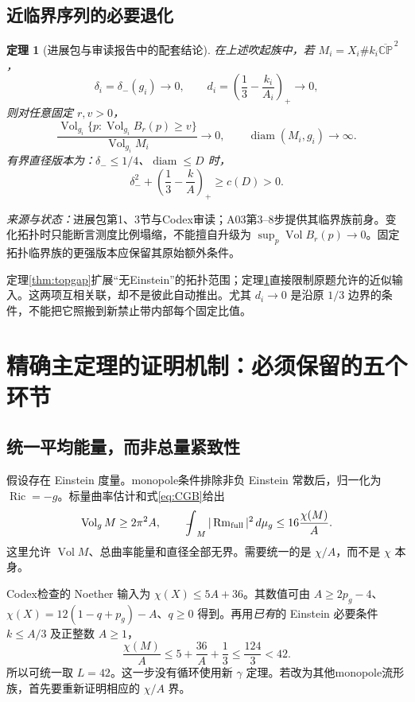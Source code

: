 \documentclass[UTF8,a4paper,11pt,fontset=fandol]{ctexart}
\numberwithin{equation}{section}
\newtheorem{theorem}{定理}[section]
\theoremstyle{definition}
\newcommand{\Ric}{\operatorname{Ric}}
\newcommand{\Rm}{\operatorname{Rm}}
\newcommand{\Vol}{\operatorname{Vol}}
\newcommand{\diam}{\operatorname{diam}}
\newcommand{\CP}{\mathbb{CP}}
\newcommand{\dd}{\,d\mu_g}
\newcommand{\fint}{\mathop{\rlap{\,\raisebox{0.1ex}{\tiny$-$}}\int}\nolimits}
\newcommand{\source}[1]{\par\noindent\textit{来源与状态：}#1\par}
\begin{document}
\subsection{近临界序列的必要退化}
\begin{theorem}[进展包与审读报告中的配套结论]\label{thm:collapse}
在上述吹起族中，若 $M_i=X_i\#k_i\overline{\CP}^{\,2}$，
\[
\delta_i=\delta_-(g_i)\longrightarrow0,
\qquad d_i=\left(\frac13-\frac{k_i}{A_i}\right)_+\longrightarrow0,
\]
则对任意固定 $r,v>0$，
\begin{equation}\label{eq:measurecollapse}
\frac{\Vol_{g_i}\{p:\Vol_{g_i}B_r(p)\ge v\}}
{\Vol_{g_i}M_i}\longrightarrow0,
\qquad \diam(M_i,g_i)\longrightarrow\infty.
\end{equation}
有界直径版本为：$\delta_-\le1/4$、$\diam\le D$ 时，
\begin{equation}\label{eq:diambound}
\delta_-^2+\left(\frac13-\frac{k}{A}\right)_+\ge c(D)>0.
\end{equation}
\end{theorem}
\source{进展包第1、3节与Codex审读；A03第3--8步提供其临界族前身。变化拓扑时只能断言测度比例塌缩，不能擅自升级为 $\sup_p\Vol B_r(p)\to0$。固定拓扑临界族的更强版本应保留其原始额外条件。}

定理\ref{thm:topgap}扩展“无Einstein”的拓扑范围；定理\ref{thm:collapse}直接限制原题允许的近似输入。这两项互相关联，却不是彼此自动推出。尤其 $d_i\to0$ 是沿原 $1/3$ 边界的条件，不能把它照搬到新禁止带内部每个固定比值。

\section{精确主定理的证明机制：必须保留的五个环节}
\subsection{统一平均能量，而非总量紧致性}
假设存在 Einstein 度量。monopole条件排除非负 Einstein 常数后，归一化为 $\Ric=-g$。标量曲率估计和式\eqref{eq:CGB}给出
\begin{equation}\label{eq:budget}
 \Vol_gM\ge2\pi^2A,
 \qquad \fint_M|\Rm_{\rm full}|^2\dd
 \le16\frac{\chi(M)}A.
\end{equation}
这里允许 $\Vol M$、总曲率能量和直径全部无界。需要统一的是 $\chi/A$，而不是 $\chi$ 本身。

Codex检查的 Noether 输入为 $\chi(X)\le5A+36$。其数值可由 $A\ge2p_g-4$、$\chi(X)=12(1-q+p_g)-A$、$q\ge0$ 得到。再用\emph{已有}的 Einstein 必要条件 $k\le A/3$ 及正整数 $A\ge1$，
\begin{equation}
 \frac{\chi(M)}A\le5+\frac{36}A+\frac13\le\frac{124}3<42.
\end{equation}
所以可统一取 $L=42$。这一步没有循环使用新 $\gamma$ 定理。若改为其他monopole流形族，首先要重新证明相应的 $\chi/A$ 界。
\end{document}
